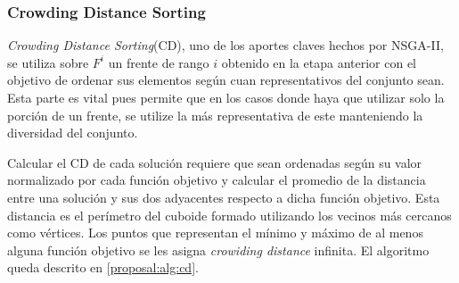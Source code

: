 

\subsubsection{Crowding Distance Sorting}
\textit{Crowding Distance Sorting}(CD), uno de los aportes claves hechos por NSGA-II, se utiliza sobre  $F^i$ un frente de rango $i$ obtenido en la etapa anterior con el objetivo de ordenar sus elementos seg\'un cuan representativos del conjunto sean. Esta parte es vital pues permite que en los casos donde haya que utilizar solo la porci\'on de un frente, se utilize la m\'as representativa de este manteniendo la diversidad del conjunto.

Calcular el CD de cada soluci\'on requiere que sean ordenadas seg\'un su valor normalizado por cada funci\'on objetivo y calcular el promedio de la distancia entre una soluci\'on y sus dos adyacentes respecto a dicha funci\'on objetivo. Esta distancia es el per\'imetro del cuboide formado utilizando los vecinos m\'as cercanos como v\'ertices. Los puntos que representan el m\'inimo y m\'aximo de al menos alguna funci\'on objetivo se les asigna \textit{crowiding distance} infinita. El  algoritmo queda descrito en \ref{proposal:alg:cd}.

